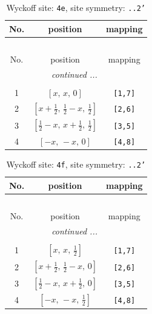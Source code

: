 \documentclass[fleqn,8pt]{jsarticle}
\begin{document}
\renewcommand{\arraystretch}{1.2}
\begin{longtable}{ccc}
\caption{Wyckoff site: {\tt 4e}, site symmetry: {\tt ..2'}}
 \\
 \hline \hline
No. & position & mapping \\ \hline \endfirsthead

\multicolumn{2}{l}{\tablename\ \thetable{}} \\
 \hline \hline
No. & position & mapping \\ \hline \endhead

 \hline \hline
\multicolumn{2}{r}{\footnotesize\it continued ...} \\ \endfoot

 \hline \hline
\multicolumn{2}{r}{} \\ \endlastfoot

1 & $\left[ x,\, x,\, 0 \right]$ & {\tt [1,7]} \\ \hline
2 & $\left[ x + \frac{1}{2},\, \frac{1}{2} - x,\, \frac{1}{2} \right]$ & {\tt [2,6]} \\ \hline
3 & $\left[ \frac{1}{2} - x,\, x + \frac{1}{2},\, \frac{1}{2} \right]$ & {\tt [3,5]} \\ \hline
4 & $\left[ - x,\, - x,\, 0 \right]$ & {\tt [4,8]} \\
\end{longtable}
\renewcommand{\arraystretch}{1.2}
\begin{longtable}{ccc}
\caption{Wyckoff site: {\tt 4f}, site symmetry: {\tt ..2'}}
 \\
 \hline \hline
No. & position & mapping \\ \hline \endfirsthead

\multicolumn{2}{l}{\tablename\ \thetable{}} \\
 \hline \hline
No. & position & mapping \\ \hline \endhead

 \hline \hline
\multicolumn{2}{r}{\footnotesize\it continued ...} \\ \endfoot

 \hline \hline
\multicolumn{2}{r}{} \\ \endlastfoot

1 & $\left[ x,\, x,\, \frac{1}{2} \right]$ & {\tt [1,7]} \\ \hline
2 & $\left[ x + \frac{1}{2},\, \frac{1}{2} - x,\, 0 \right]$ & {\tt [2,6]} \\ \hline
3 & $\left[ \frac{1}{2} - x,\, x + \frac{1}{2},\, 0 \right]$ & {\tt [3,5]} \\ \hline
4 & $\left[ - x,\, - x,\, \frac{1}{2} \right]$ & {\tt [4,8]} \\
\end{longtable}
\end{document}
